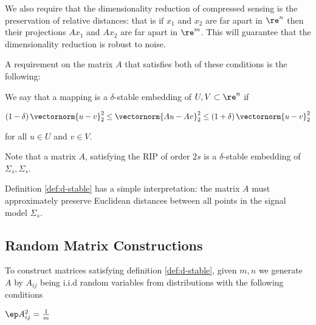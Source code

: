 \begin{remark} [Stability]
We also require that the dimensionality reduction of compressed sensing is the preservation of relative distances: that is if \(x_1\) and \(x_2\) are far apart in \(\re^n\) then their projections \(Ax_1\) and \(Ax_2\) are far apart in \(\re^m\). This will guarantee that the dimensionality reduction is robust to noise. 
\end{remark}

A requirement on the matrix \(A\) that satisfies both of these conditions is the following:

\begin{definition}
We say that a mapping is a \(\delta\)-stable embedding of \(U,V \subset \re^n\) if

\begin{equation}
\left(1 - \delta \right) \vectornorm{u-v}_2^2 \leq \vectornorm{Au-Av}_2^2 \leq \left(1 + \delta\right) \vectornorm{u-v}_2^2
\end{equation}

for all \(u \in U\) and \(v \in V\). 
\label{def:d-stable}
\end{definition} 

\begin{remark}
Note that a matrix \(A\), satisfying the RIP of order \(2s\) is a \(\delta\)-stable embedding of \(\Sigma_s, \Sigma_s\). 
\end{remark}

\begin{remark}
Definition \ref{def:d-stable} has a simple interpretation: the matrix \(A\) must approximately preserve Euclidean distances between all points in the signal model \(\Sigma_s\).
\end{remark}

\subsection{Random Matrix Constructions} \label{sec:mtx-contruction}

To construct matrices satisfying definition \ref{def:d-stable}, given \(m, n\) we generate \(A\) by \(A_{ij}\) being i.i.d random variables from distributions with the following conditions \cite{davenport2010signal}

\begin{condition}
\(\ep A_{ij}^2 = \frac{1}{m}\)
\label{cond:norm-pres}
\end{condition}

